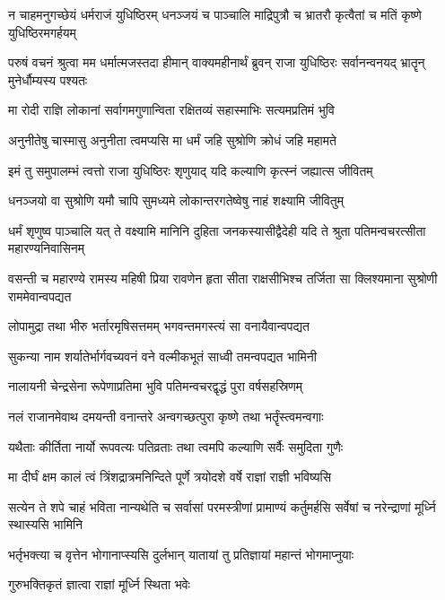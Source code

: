\threelineshloka
{न चाहमनुगच्छेयं धर्मराजं युधिष्ठिरम्}
{धनञ्जयं च पाञ्चालि माद्रिपुत्रौ च भ्रातरौ}
{कृत्वैतां च मतिं कृष्णे युधिष्ठिरमगर्हयम्}


\threelineshloka
{परुषं वचनं श्रुत्वा मम धर्मात्मजस्तदा}
{हीमान् वाक्यमहीनार्थं ब्रुवन् राजा युधिष्ठिरः}
{सर्वानन्वनयद् भ्रातॄन् मुनेर्धौम्यस्य पश्यतः}


\twolineshloka
{मा रोदी राज्ञि लोकानां सर्वागमगुणान्विता}
{रक्षितव्यं सहास्माभिः सत्यमप्रतिमं भुवि}


\twolineshloka
{अनुनीतेषु चास्मासु अनुनीता त्वमप्यसि}
{मा धर्मं जहि सुश्रोणि क्रोधं जहि महामते}


\twolineshloka
{इमं तु समुपालम्भं त्वत्तो राजा युधिष्ठिरः}
{शृणुयाद् यदि कल्याणि कृत्स्नं जह्यात्स जीवितम्}


\twolineshloka
{धनञ्जयो वा सुश्रोणि यमौ चापि सुमध्यमे}
{लोकान्तरगतेष्वेषु नाहं शक्ष्यामि जीवितुम्}


\onelineshloka
{धर्मं शृणुष्व पाञ्चालि यत् ते वक्ष्यामि मानिनि}
\twolineshloka
{दुहिता जनकस्यासीद्वैदेही यदि ते श्रुता}
{पतिमन्वचरत्सीता महारण्यनिवासिनम्}


\threelineshloka
{वसन्ती च महारण्ये रामस्य महिषी प्रिया}
{रावणेन हृता सीता राक्षसीभिश्च तर्जिता}
{सा क्लिश्यमाना सुश्रोणी राममेवान्वपद्यत}


\twolineshloka
{लोपामुद्रा तथा भीरु भर्तारमृषिसत्तमम्}
{भगवन्तमगस्त्यं सा वनायैवान्वपद्यत}


\twolineshloka
{सुकन्या नाम शर्यातेर्भार्गवच्यवनं वने}
{वल्मीकभूतं साध्वी तमन्वपद्यत भामिनी}


\twolineshloka
{नालायनी चेन्द्रसेना रूपेणाप्रतिमा भुवि}
{पतिमन्वचरद्वृद्धं पुरा वर्षसहस्रिणम्}


\twolineshloka
{नलं राजानमेवाथ दमयन्ती वनान्तरे}
{अन्वगच्छत्पुरा कृष्णे तथा भर्तॄंस्त्वमन्वगाः}


\twolineshloka
{यथैताः कीर्तिता नार्यो रूपवत्यः पतिव्रताः}
{तथा त्वमपि कल्याणि सर्वैः समुदिता गुणैः}


\twolineshloka
{मा दीर्घं क्षम कालं त्वं त्रिंशद्रात्रमनिन्दिते}
{पूर्णे त्रयोदशे वर्षे राज्ञां राज्ञी भविष्यसि}


\onelineshloka
{सत्येन ते शपे चाहं भविता नान्यथेति च}
\twolineshloka
{सर्वासां परमस्त्रीणां प्रामाण्यं कर्तुमर्हसि}
{सर्वेषां च नरेन्द्राणां मूर्ध्नि स्थास्यसि भामिनि}


\twolineshloka
{भर्तृभक्त्या च वृत्तेन भोगानाप्स्यसि दुर्लभान्}
{यातायां तु प्रतिज्ञायां महान्तं भोगमाप्नुयाः}


\onelineshloka
{गुरुभक्तिकृतं ज्ञात्वा राज्ञां मूर्ध्नि स्थिता भवेः}

